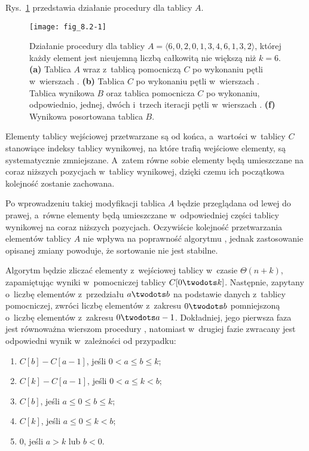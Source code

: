 
\exercise %
Rys.~\ref{fig:8.2-1} przedstawia działanie procedury  dla tablicy $A$.
\begin{figure}[ht]
	\begin{center}
		\texttt{[image: fig\_8.2-1]}
	\end{center}
	\caption{Działanie procedury  dla tablicy $A=\langle6,0,2,0,1,3,4,6,1,3,2\rangle$, której każdy element jest nieujemną liczbą całkowitą nie większą niż $k=6$. {\sffamily\bfseries(a)} Tablica $A$ wraz z~tablicą pomocniczą $C$ po wykonaniu pętli w~wierszach . {\sffamily\bfseries(b)} Tablica $C$ po wykonaniu pętli w~wierszach . {\sffamily\bfseries{}} Tablica wynikowa $B$ oraz tablica pomocnicza $C$ po wykonaniu, odpowiednio, jednej, dwóch i~trzech iteracji pętli  w~wierszach . {\sffamily\bfseries(f)} Wynikowa posortowana tablica $B$.} \label{fig:8.2-1}
\end{figure}

\exercise %
Elementy tablicy wejściowej przetwarzane są od końca, a~wartości w~tablicy $C$ stanowiące indeksy tablicy wynikowej, na które trafią wejściowe elementy, są systematycznie zmniejszane. A~zatem równe sobie elementy będą umieszczane na coraz niższych pozycjach w~tablicy wynikowej, dzięki czemu ich początkowa kolejność zostanie zachowana.

\exercise %
Po wprowadzeniu takiej modyfikacji tablica $A$ będzie przeglądana od lewej do prawej, a~równe elementy będą umieszczane w~odpowiedniej części tablicy wynikowej na coraz niższych pozycjach. Oczywiście kolejność przetwarzania elementów tablicy $A$ nie wpływa na poprawność algorytmu , jednak zastosowanie opisanej zmiany powoduje, że sortowanie nie jest stabilne.

\exercise %
Algorytm będzie zliczać elementy z~wejściowej tablicy w~czasie $\Theta(n+k)$, zapamiętując wyniki w~pomocniczej tablicy $C[0\twodots k]$. Następnie, zapytany o~liczbę elementów z~przedziału $a\twodots b$ na podstawie danych z~tablicy pomocniczej, zwróci liczbę elementów z~zakresu $0\twodots b$ pomniejszoną o~liczbę elementów z~zakresu $0\twodots a-1$. Dokładniej, jego pierwsza faza jest równoważna wierszom  procedury , natomiast w~drugiej fazie zwracany jest odpowiedni wynik w~zależności od przypadku:
\begin{enumerate}
	\renewcommand{\labelenumi}{(\roman{enumi})}
	\item $C[b]-C[a-1]$, jeśli $0<a\le b\le k$;
	\item $C[k]-C[a-1]$, jeśli $0<a\le k<b$;
	\item $C[b]$, jeśli $a\le0\le b\le k$;
	\item $C[k]$, jeśli $a\le0\le k<b$;
	\item 0, jeśli $a>k$ lub $b<0$.
\end{enumerate}

